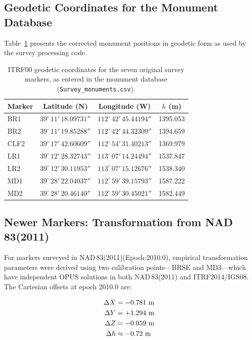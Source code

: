 \documentclass[11pt,letterpaper]{article}
\newcommand{\degree}{^\circ}
\begin{document}
\subsection{Geodetic Coordinates for the Monument Database}

Table~\ref{tab:corrected_geodetic} presents the corrected monument positions in geodetic form as used by the survey processing code.

\begin{table}[H]
\centering
\caption{ITRF00 geodetic coordinates for the seven original survey markers, as entered in the monument database (\texttt{Survey\_monuments.csv}).}
\label{tab:corrected_geodetic}
\smallskip
\small
\begin{tabular}{@{}lccc@{}}
\toprule
{Marker} & {Latitude (N)} & {Longitude (W)} & {$h$ (m)} \\
\midrule
BR1  & $39\degree\,11'\,18.09731''$ & $112\degree\,42'\,45.44194''$ & 1395.053 \\
BR2  & $39\degree\,11'\,19.85288''$ & $112\degree\,42'\,44.32309''$ & 1394.659 \\
CLF2 & $39\degree\,17'\,42.60609''$ & $112\degree\,54'\,31.40213''$ & 1369.979 \\
LR1  & $39\degree\,12'\,28.32743''$ & $113\degree\,07'\,14.24494''$ & 1537.847 \\
LR2  & $39\degree\,12'\,30.11953''$ & $113\degree\,07'\,15.12676''$ & 1538.340 \\
MD1  & $39\degree\,28'\,22.04037''$ & $112\degree\,59'\,39.15793''$ & 1587.222 \\
MD2  & $39\degree\,28'\,20.46140''$ & $112\degree\,59'\,30.45021''$ & 1582.449 \\
\bottomrule
\end{tabular}
\end{table}

\subsection{Newer Markers: Transformation from NAD\,83(2011)}

For markers surveyed in NAD\,83(2011)(Epoch:2010.0), empirical transformation parameters were derived using two calibration points---BRSE and MD3---which have independent OPUS solutions in both NAD\,83(2011) and ITRF2014/IGS08. The Cartesian offsets at epoch 2010.0 are:

\begin{align}
\Delta X &= -0.781~\text{m} \notag\\
\Delta Y &= +1.294~\text{m} \notag\\
\Delta Z &= -0.059~\text{m} \notag\\
\Delta h &\approx -0.72~\text{m}
\end{align}
\end{document}
